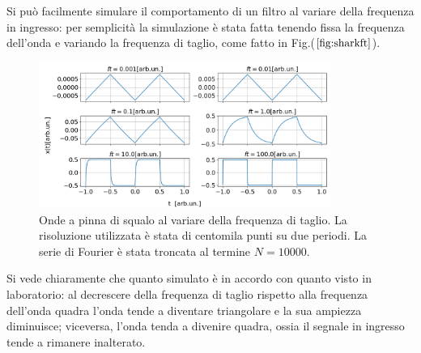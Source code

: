 \documentclass{article}
\begin{document}
                Si può facilmente simulare il comportamento di  un filtro al
                variare della frequenza in ingresso: per semplicità 
                la simulazione è stata fatta tenendo fissa la frequenza dell'onda e 
                variando la frequenza di taglio, come fatto in Fig.($\ref{fig:sharkft}$).
                    \begin{figure}[H]
                        \centering
                        \includegraphics[width=0.85\textwidth]{fousharkfinsfts1.png} %
                        \caption{Onde a pinna di squalo al variare della frequenza di taglio.
                        La risoluzione utilizzata è stata di centomila punti su due periodi.
                        La serie di Fourier è stata troncata al termine $N=10000$.}
                        \label{fig:sharkft}
                    \end{figure}

                \noindent Si vede chiaramente che quanto simulato è in accordo con quanto
                visto in laboratorio: 
                al decrescere della frequenza di taglio rispetto alla frequenza dell'onda quadra
                l'onda tende a diventare triangolare e la sua ampiezza diminuisce; viceversa,
                l'onda tenda a divenire quadra, ossia il segnale in ingresso tende a 
                rimanere inalterato.
            
            
\end{document}
